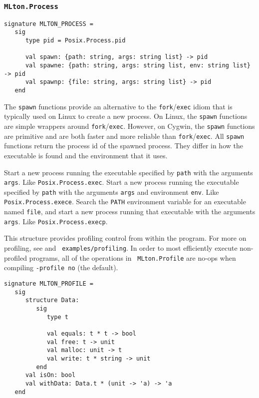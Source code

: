 \subsubsection{\tt MLton.Process}

\begin{verbatim}
signature MLTON_PROCESS =
   sig
      type pid = Posix.Process.pid

      val spawn: {path: string, args: string list} -> pid
      val spawne: {path: string, args: string list, env: string list} -> pid
      val spawnp: {file: string, args: string list} -> pid
   end
\end{verbatim}

The {\tt spawn} functions provide an alternative to the {\tt fork}/{\tt exec}
idiom that is typically used on Linux to create a new process.  On Linux, the
{\tt spawn} functions are simple wrappers around {\tt fork}/{\tt exec}.
However, on Cygwin, the {\tt spawn} functions are primitive and are both faster
and more reliable than {\tt fork}/{\tt exec}.  All {\tt spawn} functions return
the process id of the spawned process.  They differ in how the executable is
found and the environment that it uses.

\begin{description}
Start a new process running the executable specified by {\tt path} with the
arguments {\tt args}.  Like {\tt Posix.Process.exec}.
Start a new process running the executable specified by {\tt path} with the
arguments {\tt args} and environment {\tt env}.  Like {\tt Posix.Process.exece}.
Search the {\tt PATH} environment variable for an executable named {\tt file},
and start a new process running that executable with the arguments {\tt args}.
Like {\tt Posix.Process.execp}.
\end{description}

This structure provides profiling control from within the program.
For more on profiling, see  and {\tt
examples/profiling}. In order to most efficiently execute
non-profiled programs, all of the operations in {\tt
MLton.Profile} are no-ops when compiling {\tt -profile no} (the
default).

\begin{verbatim}
signature MLTON_PROFILE =
   sig
      structure Data:
         sig
            type t

            val equals: t * t -> bool
            val free: t -> unit
            val malloc: unit -> t
            val write: t * string -> unit
         end
      val isOn: bool
      val withData: Data.t * (unit -> 'a) -> 'a
   end
\end{verbatim}

